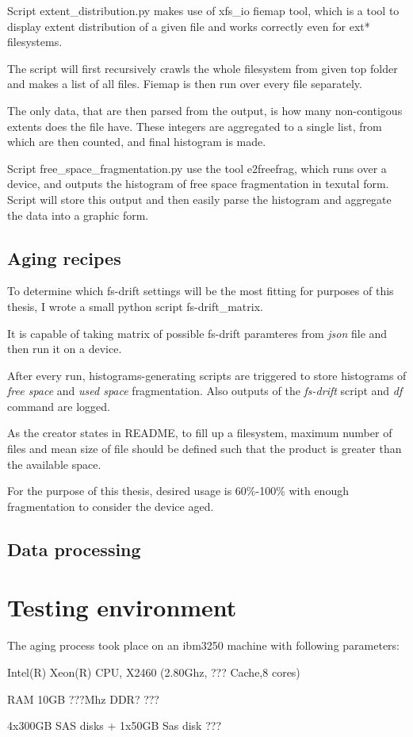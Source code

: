 \documentclass[
  color, %
  table, %
  lof,   %
  lot,   %
]{fithesis3}
\begin{document}
Script extent\_distribution.py makes use of xfs\_io fiemap tool, which is a tool to display extent distribution of a given file and works correctly even for ext* filesystems.

The script will first recursively crawls the whole filesystem from given top folder and makes a list of all files. Fiemap is then run over every file separately. 

The only data, that are then parsed from the output, is how many non-contigous extents does the file have. These integers are aggregated to a single list, from which are then counted, and final histogram is made.

Script free\_space\_fragmentation.py use the tool e2freefrag, which runs over a device, and outputs the histogram of free space fragmentation in texutal form. Script will store this output and then easily parse the histogram and aggregate the data into a graphic form.

\section{Aging recipes}
To determine which fs-drift settings will be the most fitting for purposes of this thesis, I wrote a small python script fs-drift\_matrix.

It is capable of taking matrix of possible fs-drift paramteres from \textit{json} file and then run it on a device.

After every run, histograms-generating scripts are triggered to store histograms of \textit{free space} and \textit{used space} fragmentation. Also outputs of the \textit{fs-drift} script and \textit{df} command are logged.

As the creator states in README, to fill up a filesystem, maximum number of files and mean size of file should be defined such that the product is greater than the available space.

For the purpose of this thesis, desired usage is 60\%-100\% with enough fragmentation to consider the device aged.

\section{Data processing}
\chapter{Testing environment}
The aging process took place on an ibm3250 machine with following parameters:
\begin{compactenum}
  \item Intel(R) Xeon(R) CPU, X2460 (2.80Ghz, ??? Cache,8 cores)
  \item RAM 10GB ???Mhz DDR? ???
  \item 4x300GB SAS disks + 1x50GB Sas disk ???
\end{compactenum}
\end{document}

